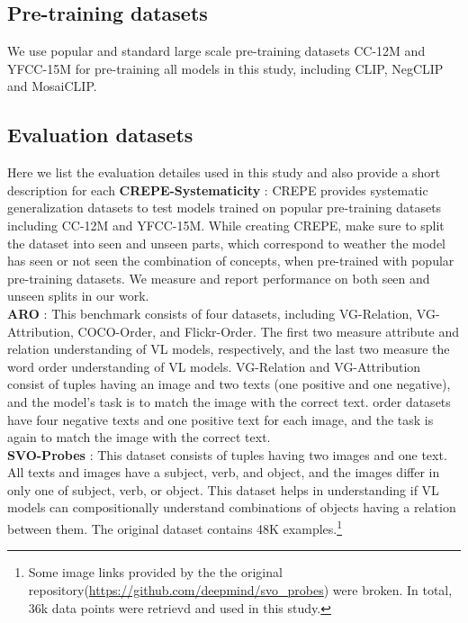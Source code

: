 \documentclass[11pt]{article}
\newcommand{\methodcomp}{MosaiCLIP}
\newcommand{\clip}{CLIP}
\newcommand{\negclip}{NegCLIP}
\begin{document}
\subsection{Pre-training datasets}
We use popular and standard large scale pre-training datasets CC-12M \citep{changpinyo2021cc12m} and YFCC-15M \citep{thomee2016yfcc100m} for pre-training all models in this study, including \clip{}, \negclip{} and \methodcomp{}.
\subsection{Evaluation datasets}
\label{eval_data_details}
Here we list the evaluation detailes used in this study and also provide a short description for each
\noindent \textbf{CREPE-Systematicity} \cite{ma2022crepe}: CREPE provides systematic generalization datasets to test models trained on popular pre-training datasets including CC-12M and YFCC-15M. While creating CREPE, \citet{ma2022crepe} make sure to split the dataset into seen and unseen parts, which correspond to weather the model has seen or not seen the combination of concepts, when pre-trained with popular pre-training datasets. We measure and report performance on both seen and unseen splits in our work.\\
\noindent \textbf{ARO} \cite{yuksekgonul2022and}: This benchmark consists of four datasets, including VG-Relation, VG-Attribution, COCO-Order, and Flickr-Order. The first two measure attribute and relation understanding of VL models, respectively, and the last two measure the word order understanding of VL models. VG-Relation and VG-Attribution consist of tuples having an image and two texts (one positive and one negative), and the model's task is to match the image with the correct text. order datasets have four negative texts and one positive text for each image, and the task is again to match the image with the correct text.\\
\noindent \textbf{SVO-Probes} \cite{hendricks-nematzadeh-2021-probing}: This dataset consists of tuples having two images and one text. All texts and images have a subject, verb, and object, and the images differ in only one of subject, verb, or object. This dataset helps in understanding if VL models can compositionally understand combinations of objects having a relation between them. The original dataset contains 48K examples.\footnote{Some image links provided by the the original repository(\url{https://github.com/deepmind/svo_probes}) were broken. In total, 36k data points were retrievd and used in this study.}\\ 
\end{document}
